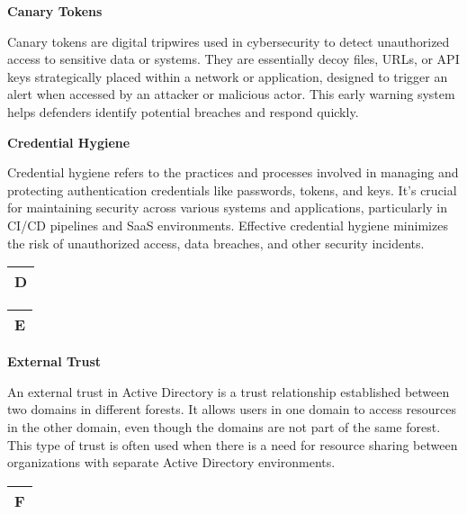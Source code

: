 \textbf{Canary Tokens}

Canary tokens are digital tripwires used in cybersecurity to detect unauthorized access to sensitive data or systems. They are essentially decoy files, URLs, or API keys strategically placed within a network or application, designed to trigger an alert when accessed by an attacker or malicious actor. This early warning system helps defenders identify potential breaches and respond quickly.

\textbf{Credential Hygiene}

Credential hygiene refers to the practices and processes involved in managing and protecting authentication credentials like passwords, tokens, and keys. It's crucial for maintaining security across various systems and applications, particularly in CI/CD pipelines and SaaS environments. Effective credential hygiene minimizes the risk of unauthorized access, data breaches, and other security incidents.

\begin{table}
\justifying

\begin{tabular}{l}
\textbf{D} \\
\hline

\end{tabular}

\end{table}

\begin{table}
\justifying

\begin{tabular}{l}
\textbf{E} \\
\hline

\end{tabular}

\end{table}

\textbf{External Trust}

An external trust in Active Directory is a trust relationship established between two domains in different forests. It allows users in one domain to access resources in the other domain, even though the domains are not part of the same forest. This type of trust is often used when there is a need for resource sharing between organizations with separate Active Directory environments.

\begin{table}
\justifying

\begin{tabular}{l}
\textbf{F} \\
\hline

\end{tabular}

\end{table}

